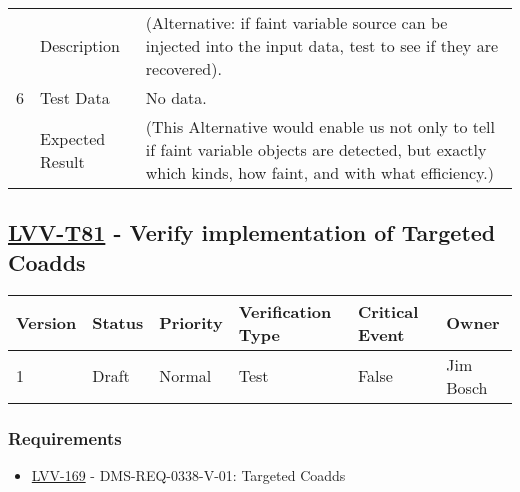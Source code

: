 \begin{longtable}[]{p{1.3cm}p{2cm}p{13cm}}
            \multirow{3}{*}{ 6 } & Description &
            \begin{minipage}[t]{13cm}{\footnotesize
            (Alternative: if faint variable source can be injected into the input
data, test to see if they are recovered).

            \vspace{\dp0}
            } \end{minipage} \\ \cline{2-3}
            & Test Data &
            \begin{minipage}[t]{13cm}{\footnotesize
                No data.
                \vspace{\dp0}
            } \end{minipage} \\ \cline{2-3}
            & Expected Result &
                \begin{minipage}[t]{13cm}{\footnotesize
                (This Alternative would enable us not only to tell if faint variable
objects are detected, but exactly which kinds, how faint, and with what
efficiency.)

                \vspace{\dp0}
                } \end{minipage}
        \\ \midrule
    \end{longtable}

\subsection{\href{https://jira.lsstcorp.org/secure/Tests.jspa\#/testCase/LVV-T81}{LVV-T81}
    - Verify implementation of Targeted Coadds}\label{lvv-t81}

\begin{longtable}[]{llllll}
\toprule
Version & Status & Priority & Verification Type & Critical Event & Owner
\\\midrule
1 & Draft & Normal &
Test & False & Jim Bosch
\\\bottomrule
\end{longtable}

\subsubsection{Requirements}
\begin{itemize}
\item \href{https://jira.lsstcorp.org/browse/LVV-169}{LVV-169} - DMS-REQ-0338-V-01: Targeted Coadds
\end{itemize}


